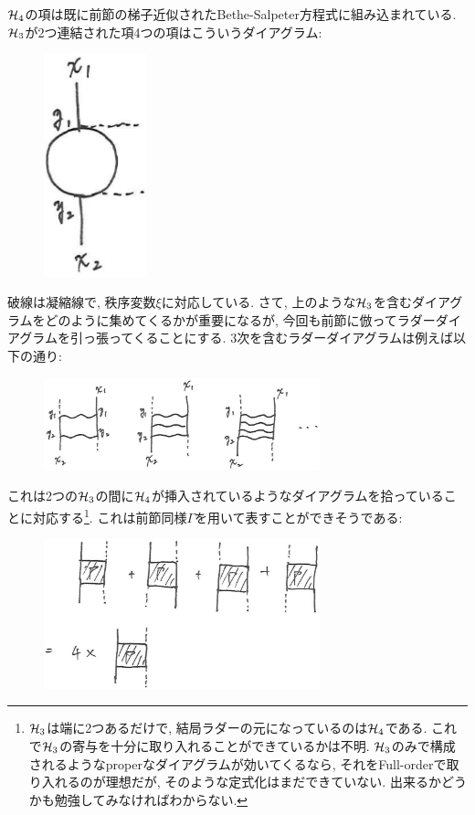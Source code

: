 \documentclass[10.5pt,a4paper]{jreport}
\begin{document}
${\cal H}_4$の項は既に前節の梯子近似されたBethe-Salpeter方程式に組み込まれている. ${\cal H}_3$が2つ連結された項4つの項はこういうダイアグラム:
\begin{figure}[H]
  \begin{center}
    \includegraphics[width = 3cm]{./EPS/ladder3-5.eps}
  \end{center}
\end{figure}
破線は凝縮線で, 秩序変数$\xi$に対応している. さて, 上のような${\cal H}_3$を含むダイアグラムをどのように集めてくるかが重要になるが, 今回も前節に倣ってラダーダイアグラムを引っ張ってくることにする. 3次を含むラダーダイアグラムは例えば以下の通り:
\begin{figure}[H]
  \begin{center}
    \includegraphics[width = 8cm]{./EPS/ladder3-1.eps}
  \end{center}
\end{figure}
これは2つの${\cal H}_3$の間に${\cal H}_4$が挿入されているようなダイアグラムを拾っていることに対応する\footnote{${\cal H}_3$は端に2つあるだけで, 結局ラダーの元になっているのは${\cal H}_4$である. これで${\cal H}_3$の寄与を十分に取り入れることができているかは不明. ${\cal H}_3$のみで構成されるようなproperなダイアグラムが効いてくるなら, それをFull-orderで取り入れるのが理想だが, そのような定式化はまだできていない. 出来るかどうかも勉強してみなければわからない. }. これは前節同様$\Gamma$を用いて表すことができそうである:
\begin{figure}[H]
  \begin{center}
    \includegraphics[width = 8cm]{./EPS/ladder3-2.eps}
  \end{center}
\end{figure}
\end{document}
